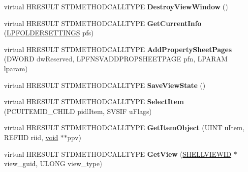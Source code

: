 \begin{DoxyCompactItemize}
\item 
\mbox{\label{class_c_def_view_aba76d0a669328e3bcbefecc9a9e6283e}} 
virtual H\+R\+E\+S\+U\+LT S\+T\+D\+M\+E\+T\+H\+O\+D\+C\+A\+L\+L\+T\+Y\+PE {\bfseries Destroy\+View\+Window} ()
\item 
\mbox{\label{class_c_def_view_a105ffe7aa8f09595a21b905868f9c601}} 
virtual H\+R\+E\+S\+U\+LT S\+T\+D\+M\+E\+T\+H\+O\+D\+C\+A\+L\+L\+T\+Y\+PE {\bfseries Get\+Current\+Info} (\hyperlink{struct_f_o_l_d_e_r_s_e_t_t_i_n_g_s}{L\+P\+F\+O\+L\+D\+E\+R\+S\+E\+T\+T\+I\+N\+GS} pfs)
\item 
\mbox{\label{class_c_def_view_a19ab3d5685d7f66506835a1ff9af11fb}} 
virtual H\+R\+E\+S\+U\+LT S\+T\+D\+M\+E\+T\+H\+O\+D\+C\+A\+L\+L\+T\+Y\+PE {\bfseries Add\+Property\+Sheet\+Pages} (D\+W\+O\+RD dw\+Reserved, L\+P\+F\+N\+S\+V\+A\+D\+D\+P\+R\+O\+P\+S\+H\+E\+E\+T\+P\+A\+GE pfn, L\+P\+A\+R\+AM lparam)
\item 
\mbox{\label{class_c_def_view_a9a94951ea57fac6567d8e6e9a006b62b}} 
virtual H\+R\+E\+S\+U\+LT S\+T\+D\+M\+E\+T\+H\+O\+D\+C\+A\+L\+L\+T\+Y\+PE {\bfseries Save\+View\+State} ()
\item 
\mbox{\label{class_c_def_view_a059edda594ec4527f745aadcfc798f24}} 
virtual H\+R\+E\+S\+U\+LT S\+T\+D\+M\+E\+T\+H\+O\+D\+C\+A\+L\+L\+T\+Y\+PE {\bfseries Select\+Item} (P\+C\+U\+I\+T\+E\+M\+I\+D\+\_\+\+C\+H\+I\+LD pidl\+Item, S\+V\+S\+IF u\+Flags)
\item 
\mbox{\label{class_c_def_view_a3c173f5a17b22a39bf72a9297a4b55d7}} 
virtual H\+R\+E\+S\+U\+LT S\+T\+D\+M\+E\+T\+H\+O\+D\+C\+A\+L\+L\+T\+Y\+PE {\bfseries Get\+Item\+Object} (U\+I\+NT u\+Item, R\+E\+F\+I\+ID riid, \hyperlink{interfacevoid}{void} $\ast$$\ast$ppv)
\item 
\mbox{\label{class_c_def_view_a53bc83fd05914249d7095799c8ed049f}} 
virtual H\+R\+E\+S\+U\+LT S\+T\+D\+M\+E\+T\+H\+O\+D\+C\+A\+L\+L\+T\+Y\+PE {\bfseries Get\+View} (\hyperlink{interface_g_u_i_d}{S\+H\+E\+L\+L\+V\+I\+E\+W\+ID} $\ast$view\+\_\+guid, U\+L\+O\+NG view\+\_\+type)
\item 
\mbox{\label{class_c_def_view_aa52066258f22b5d296087c0f3620bcae}} 
$$
\end{DoxyCompactItemize}
